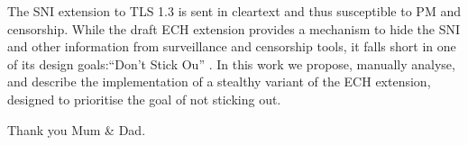 
\thesistitlepage                                  %



\begin{thesisabstract}                            %
The \ac{SNI} extension to TLS 1.3 is sent in cleartext and thus susceptible to \ac{PM} and censorship. While the draft \ac{ECH} extension provides a mechanism to hide the \ac{SNI} and other information from surveillance and censorship tools, it falls short in one of its design goals:``Don’t Stick Ou'' \cite{rfc8744-issues}. In this work we propose, manually analyse, and describe the implementation of a stealthy variant of the \ac{ECH} extension, designed to prioritise the goal of not sticking out.

\end{thesisabstract}


\begin{thesisacknowledgments}                     %
  Thank you Mum \& Dad.                           %
\end{thesisacknowledgments}                       %
  
  
\tableofcontents                                  %
\listoftables                                     %
\listoffigures                                    %
\listoflistings





%



\nocite{*}



%
% 




